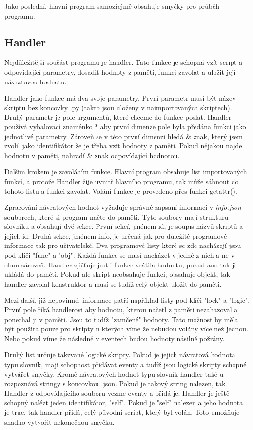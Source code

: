 \documentclass[12pt,a4paper]{article}
\begin{document}
Jako poslední, hlavní program samozřejmě obsahuje smyčky pro průběh programu.

\subsection{Handler}
Nejdůležitější součást programu je handler. Tato funkce je schopná vzít script a odpovídající parametry, dosadit hodnoty z paměti, funkci zavolat a uložit její návratovou hodnotu. 

Handler jako funkce má dva svoje parametry. První parametr musí být název skriptu bez koncovky .py (takto jsou uloženy v naimportovaných skriptech). Druhý parametr je pole argumentů, které chceme do funkce poslat. Handler používá vybalovací znaménko * aby první dimenze pole byla předána funkci jako jednotlivé parametry. Zároveň se v této první dimenzi hledá \& znak, který jsem zvolil jako identifikátor že je třeba vzít hodnoty z paměti. Pokud nějakou najde hodnotu v paměti, nahradí \& znak odpovídající hodnotou.

Dalším krokem je zavoláním funkce. Hlavní program obsahuje list importovaných funkcí, a protože Handler žije uvnitř hlavního programu, tak může sáhnout do tohoto listu a funkci zavolat. Volání funkce je provedeno přes funkci getattr().

Zpracování návratových hodnot vyžaduje správné zapsaní informací v \textit{info.json} souborech, které si program načte do paměti. Tyto soubory mají strukturu slovníku a obsahují dvě sekce. První sekcí, jménem id, je soupis názvů skriptů a jejich id. Druhá sekce, jménem info, je určená jak pro důležité programové informace tak pro uživatelské. Dva programové listy které se zde nacházejí jsou pod klíči "func" a "obj". Každá funkce se musí nacházet v jedné z nich a ne v obou zároveň. Handler zjišťuje jestli funkce vrátila hodnotu, pokud ano tak ji ukládá do paměti. Pokud ale skript neobsahuje funkci, obsahuje objekt, tak handler zavolal konstruktor a musí se tudíž celý objekt uložit do paměti.

Mezi další, již nepovinné, informace patří například listy pod klíči "lock" a "logic". První pole říká handlerovi aby hodnotu, kterou načetl z paměti nezahazoval a ponechal ji v paměti. Jsou to tudíž "zamčené" hodnoty. Tato možnost by měla být použita pouze pro skripty u kterých víme že nebudou volány více než jednou. Nebo pokud víme že následně v eventech budou hodnoty násilně požrány. 

Druhý list určuje takzvané logické skripty. Pokud je jejich návratová hodnota typu slovník, mají schopnost přidávat eventy a tudíž jsou logické skripty schopné vytvářet smyčky. Kromě návratových hodnot typu slovník handler také u rozpoznává stringy s koncovkou .json. Pokud je takový string nalezen, tak Handler z odpovídajícího souboru vezme eventy a přidá je. Handler je ještě schopný nalézt jeden identifikátor, "self". Pokud je "self" nalezen a jeho hodnota je true, tak handler přidá, celý původní script, který byl volán. Toto umožňuje snadno vytvořit nekonečnou smyčku.
\end{document}
